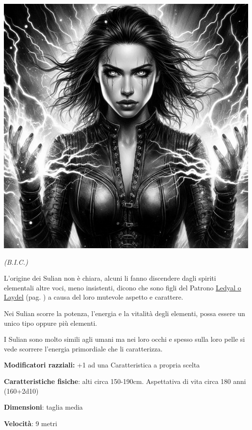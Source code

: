 \begin{multicols}{2}
\begin{center}

\includegraphics[width=0.7\linewidth]{immagini/sulian4-ai.png}

\emph{(B.I.C.)}

\end{center}

%

L'origine dei Sulian non è chiara, alcuni li fanno discendere dagli spiriti elementali altre voci, meno insistenti, dicono che sono figli del Patrono \hyperlink{ledyal}{Ledyal o Laydel} (pag. \pageref{ledyal}) a causa del loro mutevole aspetto e carattere.

Nei Sulian scorre la potenza, l'energia e la vitalità degli elementi, possa essere un unico tipo oppure più elementi.

I Sulian sono molto simili agli umani ma nei loro occhi e spesso sulla loro pelle si vede scorrere l'energia primordiale che li caratterizza.

\textbf{Modificatori razziali:} +1 ad una Caratteristica a propria scelta

\textbf{Caratteristiche fisiche}: alti circa 150-190cm. Aspettativa di vita circa 180 anni (160+2d10)

\textbf{Dimensioni}: taglia media

\textbf{Velocità}: 9 metri


\end{multicols}
